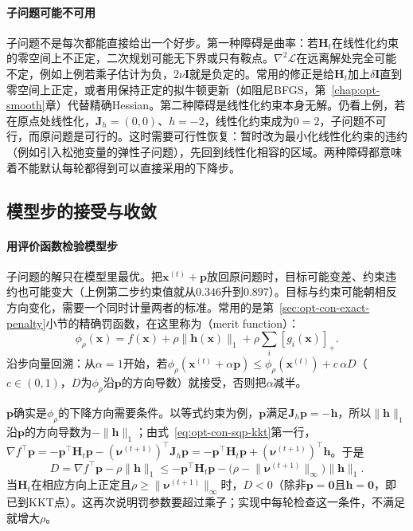 \paragraph{子问题可能不可用}
子问题不是每次都能直接给出一个好步。第一种障碍是曲率：若$\bm H_t$在线性化约束的零空间上不正定，二次规划可能无下界或只有鞍点。$\nabla^2\mathcal L$在远离解处完全可能不定，例如上例若乘子估计为负，$2\nu\bm I$就是负定的。常用的修正是给$\bm H_t$加上$\delta\bm I$直到零空间上正定，或者用保持正定的拟牛顿更新（如阻尼BFGS，第~\ref{chap:opt-smooth}章）代替精确Hessian。第二种障碍是线性化约束本身无解。仍看上例，若在原点处线性化，$\bm J_h=(0,0)$、$h=-2$，线性化约束成为$0=2$，子问题不可行，而原问题是可行的。这时需要可行性恢复：暂时改为最小化线性化约束的违约（例如引入松弛变量的弹性子问题），先回到线性化相容的区域。两种障碍都意味着不能默认每轮都得到可以直接采用的下降步。

\subsection{模型步的接受与收敛}
\label{sec:opt-con-sqp-acceptance}

\paragraph{用评价函数检验模型步}
子问题的解只在模型里最优。把$\bm x^{(t)}+\bm p$放回原问题时，目标可能变差、约束违约也可能变大（上例第二步约束值就从$0.346$升到$0.897$）。目标与约束可能朝相反方向变化，需要一个同时计量两者的标准。常用的是第~\ref{sec:opt-con-exact-penalty}小节的精确罚函数，在这里称为（merit function）：
\[
  \phi_\rho(\bm x)=f(\bm x)+\rho\lVert\bm h(\bm x)\rVert_1+\rho\sum_i[g_i(\bm x)]_+.
\]
沿步向量回溯：从$\alpha=1$开始，若$\phi_\rho(\bm x^{(t)}+\alpha\bm p)\leq\phi_\rho(\bm x^{(t)})+c\,\alpha D$（$c\in(0,1)$，$D$为$\phi_\rho$沿$\bm p$的方向导数）就接受，否则把$\alpha$减半。

$\bm p$确实是$\phi_\rho$的下降方向需要条件。以等式约束为例，$\bm p$满足$\bm J_h\bm p=-\bm h$，所以$\lVert\bm h\rVert_1$沿$\bm p$的方向导数为$-\lVert\bm h\rVert_1$；由式~\eqref{eq:opt-con-sqp-kkt}第一行，$\nabla f^\top\bm p=-\bm p^\top\bm H_t\bm p-(\bm\nu^{(t+1)})^\top\bm J_h\bm p=-\bm p^\top\bm H_t\bm p+(\bm\nu^{(t+1)})^\top\bm h$。于是
\[
  D=\nabla f^\top\bm p-\rho\lVert\bm h\rVert_1\leq-\bm p^\top\bm H_t\bm p-\bigl(\rho-\lVert\bm\nu^{(t+1)}\rVert_\infty\bigr)\lVert\bm h\rVert_1.
\]
当$\bm H_t$在相应方向上正定且$\rho\geq\lVert\bm\nu^{(t+1)}\rVert_\infty$时，$D<0$（除非$\bm p=\bm0$且$\bm h=\bm0$，即已到KKT点）。这再次说明罚参数要超过乘子；实现中每轮检查这一条件，不满足就增大$\rho$。


